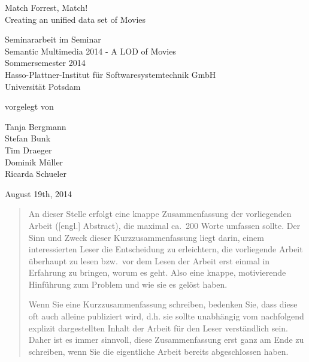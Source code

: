 \documentclass[11pt, a4paper]{article}
\begin{document}
          

\begin{titlepage}
  \begin{center} 
    \mbox{}
    \vspace{1cm}
    
    {\huge Match Forrest, Match! \\[1em] {\LARGE Creating an unified data set of Movies}}  
        
    \vspace{5cm}
    
    Seminararbeit im Seminar \\[1em]
    {\large \sc Semantic Multimedia 2014 - A LOD of Movies} \\[1em]
    Sommersemester 2014 \\[1em]
    Hasso-Plattner-Institut für Softwaresystemtechnik GmbH \\[1em]
    Universität Potsdam
    
    \vspace{3cm}
    
		vorgelegt von
		
    \vspace{1em}
    
		{\Large Tanja Bergmann} \\
		{\Large Stefan Bunk} \\
		{\Large Tim Draeger} \\
		{\Large Dominik Müller} \\
		{\Large Ricarda Schueler}
		
    \vspace{4em}
    
    August 19th, 2014
  \end{center}
\end{titlepage}


\setcounter{page}{1}

\begin{abstract}
\noindent
An dieser Stelle erfolgt eine knappe Zusammenfassung der vorliegenden Arbeit ([engl.] Abstract), die maximal ca.~200 Worte umfassen sollte. 
Der Sinn und Zweck dieser Kurzzusammenfassung liegt darin, einem interessierten Leser die Entscheidung zu erleichtern, die vorliegende Arbeit überhaupt zu lesen bzw.~vor dem Lesen der Arbeit erst einmal in Erfahrung zu bringen, worum es geht.
Also eine knappe, motivierende Hinführung zum Problem und wie sie es gelöst haben.

\bigskip

Wenn Sie eine Kurzzusammenfassung schreiben, bedenken Sie, dass diese oft auch alleine publiziert wird, d.h. sie sollte unabhängig vom nachfolgend explizit dargestellten Inhalt der Arbeit für den Leser verständlich sein.
Daher ist es immer sinnvoll, diese Zusammenfassung erst ganz am Ende zu schreiben, wenn Sie die eigentliche Arbeit bereits abgeschlossen haben.
\end{abstract}
\end{document}
